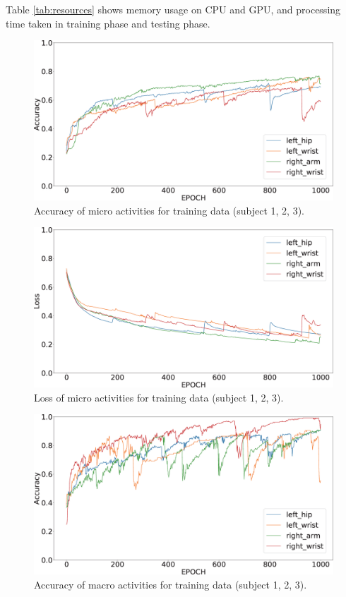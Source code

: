 \documentclass{svmult}
\begin{document}
Table \ref{tab:resources} shows memory usage on CPU and GPU, and processing time taken in training phase and testing phase.

\begin{figure}[h]
\sidecaption[t]
\includegraphics[width=0.75\linewidth]{Accuracy_micro}
\caption{Accuracy of micro activities for training data (subject 1, 2, 3).}
\label{fig:acc}
\end{figure}

\begin{figure}[h]
\sidecaption[t]
\includegraphics[width=0.75\linewidth]{Loss_micro}
\caption{Loss of micro activities for training data (subject 1, 2, 3).}
\label{fig:loss}
\end{figure}

\begin{figure}[h]
\sidecaption[t]
\includegraphics[width=0.75\linewidth]{Accuracy_macro}
\caption{Accuracy of macro activities for training data (subject 1, 2, 3).}
\label{fig:acc_recipe}
\end{figure}
\end{document}
